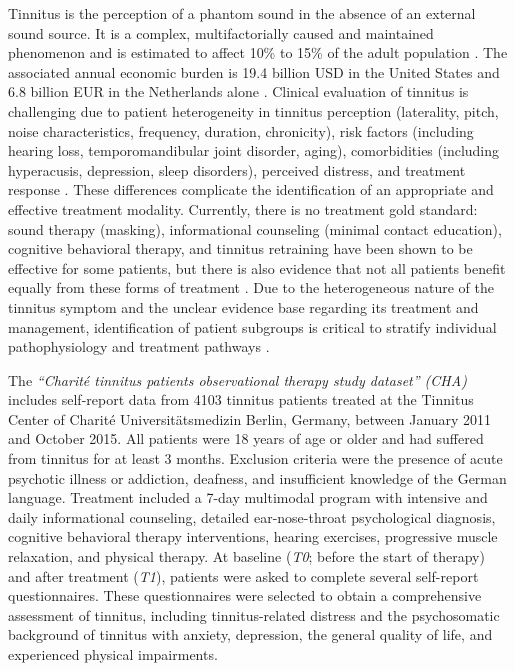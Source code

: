 \documentclass[
  oneside]{book}
\begin{document}
Tinnitus is the perception of a phantom sound in the absence of an external sound source.
It is a complex, multifactorially caused and maintained phenomenon and is estimated to affect 10\% to 15\% of the adult population \autocite{Baguley:Tinnitus2013}.
The associated annual economic burden is 19.4 billion USD in the
United States \autocite{Bhatt:TinnitusAnxietyDepression2017} and 6.8 billion EUR in the Netherlands alone \autocite{Maes:TinnitusCosts2013}.
Clinical evaluation of tinnitus is challenging due to patient heterogeneity in tinnitus perception (laterality, pitch, noise characteristics, frequency, duration, chronicity), risk factors (including hearing loss, temporomandibular joint disorder, aging), comorbidities (including hyperacusis, depression, sleep disorders), perceived distress, and treatment response \autocite{Cederroth2019}.
These differences complicate the identification of an appropriate and effective treatment modality.
Currently, there is no treatment gold standard: sound therapy (masking), informational counseling (minimal contact education), cognitive behavioral therapy, and tinnitus retraining have been shown to be effective for some patients, but there is also evidence that not all patients benefit equally from these forms of treatment \autocite{Hobson:SoundTherapy2012,Kroner:Counseling2003,Henry:Counseling1996,Martinez:CBTReview2007,Phillips:TRT2010}.
Due to the heterogeneous nature of the tinnitus symptom and the unclear evidence base regarding its treatment and management, identification of patient subgroups is critical to stratify individual pathophysiology and treatment pathways \autocite{Langguth:LCA2017,Tyler:TinnitusClustering2008,Landgrebe:TRI2010}.

The \emph{``Charité tinnitus patients observational therapy study dataset'' (CHA)} includes self-report data from 4103 tinnitus patients treated at the Tinnitus Center of Charité Universitätsmedizin Berlin, Germany, between January 2011 and October 2015.
All patients were 18 years of age or older and had suffered from tinnitus for at least 3 months.
Exclusion criteria were the presence of acute psychotic illness or addiction, deafness, and insufficient knowledge of the German language.
Treatment included a 7-day multimodal program with intensive and daily informational counseling, detailed ear-nose-throat psychological diagnosis, cognitive behavioral therapy interventions, hearing exercises, progressive muscle relaxation, and physical therapy.
At baseline (\emph{T0}; before the start of therapy) and after treatment (\emph{T1}), patients were asked to complete several self-report questionnaires.
These questionnaires were selected to obtain a comprehensive assessment of tinnitus, including tinnitus-related distress and the psychosomatic background of tinnitus with anxiety, depression, the general quality of life, and experienced physical impairments.
\end{document}
